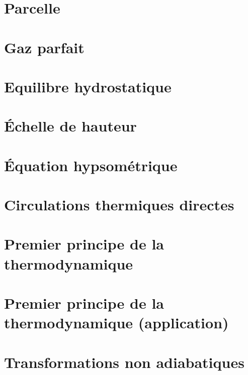 \documentclass[a4paper,DIV16,10pt]{scrartcl}
\begin{document}
 \inidoc

\newpage
\section{Parcelle}




\newpage
\section{Gaz parfait}


\newpage
\section{Equilibre hydrostatique}


\newpage
\section{\'Echelle de hauteur}

\mk\mk\mk\mk\mk
\begin{detail}

\end{detail}

\newpage
\section{\'Equation hypsométrique}


\newpage
\section{Circulations thermiques directes}


\newpage
\section{Premier principe de la thermodynamique}


\newpage
\section{Premier principe de la thermodynamique (application)}

\section{Transformations non adiabatiques}

\end{document}
